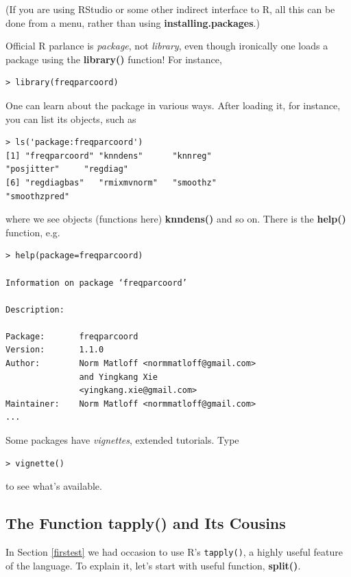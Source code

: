 (If you are using RStudio or some other indirect interface to R, all
this can be done from a menu, rather than using {\bf
installing.packages}.)

Official R parlance is {\it package}, not {\it library}, even though
ironically one loads a package using the {\bf library()} function!  For
instance,

\begin{lstlisting}
> library(freqparcoord)
\end{lstlisting}

One can learn about the package in various ways.  After loading it, for
instance, you can list its objects, such as

\begin{lstlisting}
> ls('package:freqparcoord')
[1] "freqparcoord" "knndens"      "knnreg"       
"posjitter"     "regdiag"     
[6] "regdiagbas"   "rmixmvnorm"   "smoothz"      
"smoothzpred" 
\end{lstlisting}

where we see objects (functions here) {\bf knndens()} and so on.  There
is the {\bf help()} function, e.g.

\begin{lstlisting}
> help(package=freqparcoord) 

Information on package ‘freqparcoord’

Description:

Package:       freqparcoord
Version:       1.1.0
Author:        Norm Matloff <normmatloff@gmail.com>  
               and Yingkang Xie 
               <yingkang.xie@gmail.com>
Maintainer:    Norm Matloff <normmatloff@gmail.com>
...
\end{lstlisting}

Some packages have {\it vignettes}, extended tutorials.  Type

\begin{lstlisting}
> vignette()
\end{lstlisting}

to see what's available.

\subsection{The Function {\bf tapply()} and Its Cousins}
\label{tapply}

In Section \ref{firstest} we had occasion to use R's {\tt tapply()}, a
highly useful feature of the language.  To explain it, let's start with
useful function, {\bf split()}.

